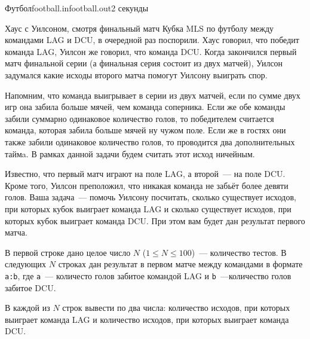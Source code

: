 \begin{problem}{Футбол}{football.in}{football.out}{2 секунды}


Хаус с Уилсоном, смотря финальный матч Кубка MLS по футболу между командами LAG и DCU, в очередной раз поспорили.
Хаус говорил, что победит команда LAG, Уилсон же говорил, что команда DCU. Когда закончился первый матч финальной
серии (а финальная серия состоит из двух матчей), Уилсон задумался какие исходы второго матча помогут Уилсону выиграть
спор.

Напомним, что команда выигрывает в серии из двух матчей, если по сумме двух игр она забила больше мячей, чем команда
соперника. Если же обе команды забили суммарно одинаковое количество голов, то победителем считается команда, которая забила
больше мячей ну чужом поле. Если же в гостях они также забили одинаковое количество голов, то проводится два дополнительных таймa. В рамках 
данной задачи будем считать этот исход ничейным.

Известно, что первый матч играют на поле LAG, а второй~--- на поле DCU. Кроме того, Уилсон преположил, что никакая команда не забьёт 
более девяти голов. Ваша задача~--- помочь Уилсону посчитать, сколько существует исходов, при которых кубок выиграет команда LAG и сколько существует исходов, при которых кубок выиграет 
команда DCU. При этом вам будет дан результат первого матча.

\InputFile
В первой строке дано целое число $N$ ($1 \le N \le 100$)~--- количество тестов.
В следующих $N$ строках дан результат в первом матче между командами в формате \texttt{a:b}, где \texttt{a}~--- количесто голов забитое 
командой LAG и \texttt{b}~---количество голов забитое DCU.

\OutputFile
В каждой из $N$ строк вывести по два числа: количество исходов, при которых выиграет команда LAG и количество исходов, при которых выиграет команда DCU.              

\Examples
\begin{example}%
%
\end{example}

\end{problem}
